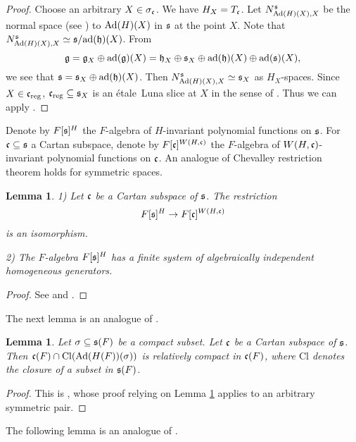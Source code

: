 \documentclass[a4paper]{amsart}
\newcommand{\Cl}{{\mathrm{Cl}}}                      \newcommand{\cm}{{\mathrm {cm}}}		\newcommand{\Cent}{{\mathrm{Cent}}}
\newcommand{\etale}{\'{e}tale~}			\newcommand{\el}{\mathrm{ell}}
\newtheorem{lem}[thm]{Lemma}
\theoremstyle{definition}
\theoremstyle{remark}
\numberwithin{equation}{subsection}
\begin{document}
\begin{proof}
Choose an arbitrary $X\in\sigma_{\mathfrak{c}}$. We have $H_X=T_{\mathfrak{c}}$. Let $N_{{\mathrm{Ad}}(H)(X), X}^{\mathfrak{s}}$ be the normal space (see \cite[Notation 2.3.3]{MR2553879}) to ${\mathrm{Ad}}(H)(X)$ in ${\mathfrak{s}}$ at the point $X$. 
Note that $N_{{\mathrm{Ad}}(H)(X),X}^{\mathfrak{s}}\simeq{\mathfrak{s}}/{\mathrm{ad}}({\mathfrak{h}})(X)$. From 
$$ {\mathfrak{g}}={\mathfrak{g}}_X\oplus{\mathrm{ad}}({\mathfrak{g}})(X)={\mathfrak{h}}_X\oplus{\mathfrak{s}}_X\oplus{\mathrm{ad}}({\mathfrak{h}})(X)\oplus{\mathrm{ad}}({\mathfrak{s}})(X), $$
we see that ${\mathfrak{s}}={\mathfrak{s}}_X\oplus{\mathrm{ad}}({\mathfrak{h}})(X)$. Then $N_{{\mathrm{Ad}}(H)(X),X}^{\mathfrak{s}}\simeq{\mathfrak{s}}_X$ as $H_X$-spaces. Since $X\in{\mathfrak{c}}_{\mathrm{reg}}$, ${\mathfrak{c}}_{\mathrm{reg}}\subseteq{\mathfrak{s}}_X$ is an \etale Luna slice at $X$ in the sense of \cite[Theorem A.2.3]{MR2553879}. Thus we can apply \cite[Lemma 3.10]{MR3245011}. 
\end{proof}

Denote by $F[{\mathfrak{s}}]^H$ the $F$-algebra of $H$-invariant polynomial functions on ${\mathfrak{s}}$. For ${\mathfrak{c}}\subseteq{\mathfrak{s}}$ a Cartan subspace, denote by $F[{\mathfrak{c}}]^{W(H, {\mathfrak{c}})}$ the $F$-algebra of $W(H, {\mathfrak{c}})$-invariant polynomial functions on ${\mathfrak{c}}$. An analogue of Chevalley restriction theorem holds for symmetric spaces. 

\begin{lem}\label{chevalley}
	1) Let ${\mathfrak{c}}$ be a Cartan subspace of ${\mathfrak{s}}$. The restriction 
	$$ F[{\mathfrak{s}}]^H\rightarrow F[{\mathfrak{c}}]^{W(H, {\mathfrak{c}})} $$
	is an isomorphism. 
	
	2) The $F$-algebra $F[{\mathfrak{s}}]^H$ has a finite system of algebraically independent homogeneous generators. 
\end{lem}

\begin{proof}
	See \cite[Theorem 7 and Corollary of Theorem 8]{zbMATH03577478} and \cite[Proposition 2.3]{MR1375304}. 
\end{proof}

The next lemma is an analogue of \cite[Lemma 28]{MR0414797}. 

\begin{lem}\label{lem28}
Let $\sigma\subseteq{\mathfrak{s}}(F)$ be a compact subset. Let ${\mathfrak{c}}$ be a Cartan subspace of ${\mathfrak{s}}$. Then $\fc(F)\cap\Cl(\Ad(H(F))(\sigma))$ is relatively compact in ${\mathfrak{c}}(F)$, where $\Cl$ denotes the closure of a subset in ${\mathfrak{s}}(F)$. 
\end{lem}

\begin{proof}
This is \cite[Lemma 6.12]{MR3414387}, whose proof relying on Lemma \ref{chevalley} applies to an arbitrary symmetric pair. 
\end{proof}

The following lemma is an analogue of \cite[Lemme III.4]{MR1344131}. 
\end{document}
